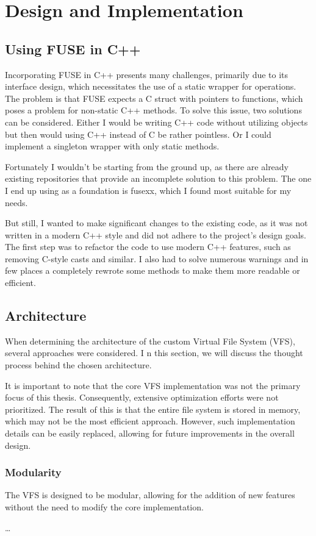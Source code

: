 \chapter{Design and Implementation}
\label{chap:design-and-architecture}

\section{Using FUSE in C++}\label{sec:fuse-in-cpp}

Incorporating FUSE in C++ presents many challenges, primarily due to its interface design, which necessitates the use of a static wrapper for operations.
The problem is that FUSE expects a C struct with pointers to functions, which poses a problem for non-static C++ methods.
To solve this issue, two solutions can be considered.
Either I would be writing C++ code without utilizing objects but then would using C++ instead of C be rather pointless.
Or I could implement a singleton wrapper with only static methods.

Fortunately I wouldn't be starting from the ground up, as there are already existing repositories that provide an incomplete solution to this problem.
The one I end up using as a foundation is fusexx, which I found most suitable for my needs.

But still, I wanted to make significant changes to the existing code, as it was not written in a modern C++ style and did not adhere to the project's design goals.
The first step was to refactor the code to use modern C++ features, such as removing C-style casts and similar.
I also had to solve numerous warnings and in few places a completely rewrote some methods to make them more readable or efficient.


\section{Architecture}\label{sec:architecture}

When determining the architecture of the custom Virtual File System (VFS), several approaches were considered. I
n this section, we will discuss the thought process behind the chosen architecture.

It is important to note that the core VFS implementation was not the primary focus of this thesis.
Consequently, extensive optimization efforts were not prioritized.
The result of this is that the entire file system is stored in memory, which may not be the most efficient approach.
However, such implementation details can be easily replaced, allowing for future improvements in the overall design.

\subsection{Modularity}

The VFS is designed to be modular, allowing for the addition of new features without the need to modify the core implementation.


\ldots